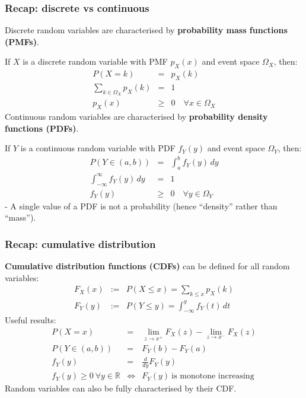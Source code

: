 \documentclass[t,8pt]{beamer}
\begin{document}
\begin{frame}
	\frametitle{Recap: discrete vs continuous}
	Discrete random variables are characterised by {\bf probability mass functions (PMFs)}. \par
	If $X$ is a discrete random variable with PMF $p_X(x)$ and event space $\Omega_X$, then:
	\begin{eqnarray*}
		P(X=k)&=&p_X(k)\\
		\sum_{k\in\Omega_X}p_X(k)&=&1\\
		p_X(x)&\geq&0 \quad \forall x\in\Omega_X
	\end{eqnarray*}
	Continuous random variables are characterised by {\bf probability density functions (PDFs)}. \par
	If $Y$ is a continuous random variable with PDF $f_Y(y)$ and event space $\Omega_Y$, then:
	\begin{eqnarray*}
		P(Y\in(a,b))&=&\int_a^b f_Y(y)\,dy\\
		\int_{-\infty}^{\infty} f_Y(y)\,dy&=&1\\
		f_Y(y)&\geq&0 \quad \forall y\in\Omega_Y
	\end{eqnarray*}
	- A single value of a PDF is not a probability (hence ``density'' rather than ``mass'').
\end{frame}

\begin{frame}
	\frametitle{Recap: cumulative distribution}
	{\bf Cumulative distribution functions (CDFs)} can be defined for all random variables:
	\begin{eqnarray*}
		F_X(x)&:=&P(X\leq x)=\sum_{k\leq x}p_X(k)\\
		F_Y(y)&:=&P(Y\leq y)=\int_{-\infty}^y f_Y(t)\,dt
	\end{eqnarray*}
	Useful results:
	\begin{eqnarray*}
		P(X=x)&=&\lim_{z\rightarrow x^+}F_X(z)-\lim_{z\rightarrow x^-}F_X(z)\\
		P(Y\in(a,b))&=&F_Y(b)-F_Y(a)\\
		f_Y(y)&=&\frac{d}{dy}F_Y(y)\\
		f_Y(y)\geq 0\ \forall y\in\mathbb R &\Leftrightarrow& F_Y(y)\ \text{is monotone increasing}
	\end{eqnarray*}
	Random variables can also be fully characterised by their CDF.
\end{frame}
\end{document}
